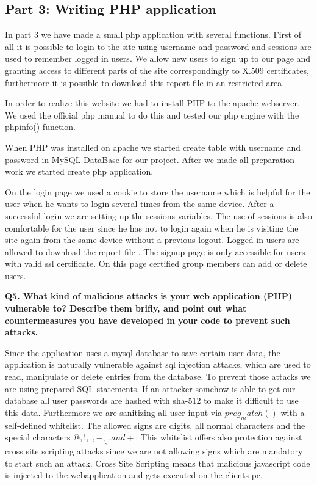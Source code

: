 \subsection {Part 3: Writing PHP application}


\noindent
In part 3 we have made a small php application with several functions. First of all it is possible to login to the site using username and password and sessions are used to remember logged in users. We allow new users to sign up to our page and granting access to different parts of the site correspondingly to X.509 certificates, furthermore it is possible to download this report file in an restricted area. \newline

\noindent
In order to realize this website we had to install PHP to the apache webserver. We used the official php manual to do this \cite{phpinstall}  and tested our php engine with the phpinfo() function.\newline

\noindent
When PHP was installed on apache we started  create table  with username and password  in MySQL DataBase for our project. After we made all preparation work we started create php application. 
\newline

\noindent
On the login page we used a cookie to store the username which is helpful for the user when he wants to login several times from the same device. After a successful login we are setting up the sessions variables. The use of sessions is also comfortable for the user since he has not to login again when he is visiting the site again from the same device without a previous logout. Logged in users  are allowed to download the report file . The signup page is only accessible for users with valid ssl certificate. On this page certified group members can add or delete users.
\newline

\noindent
{\bf Q5. What kind of malicious attacks is your web application (PHP) vulnerable to? Describe them brifly, and point out what countermeasures you have
developed in your code to prevent such attacks.}
\newline

\noindent
Since the application uses a mysql-database to save certain user data, the application is naturally vulnerable against sql injection attacks, which are used to read, manipulate or delete entries from the database. To prevent those attacks we are using prepared SQL-statements. If an attacker somehow is able to get our database all user passwords are hashed with sha-512 to make it difficult to use this data. Furthermore we are sanitizing all user input via $preg_match()$ with a self-defined whitelist. The allowed signs are digits, all normal characters and the special characters $@,!,.,-,_,.and +$. This whitelist offers also protection against cross site scripting attacks since we are not allowing signs which are mandatory to start such an attack. Cross Site Scripting means that malicious javascript code is injected to the webapplication and gets executed on the clients pc. \cite {sqlinjection, xss}
\newline

